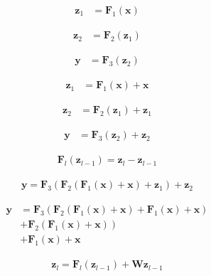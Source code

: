 \documentclass{article}
\begin{document}
\begin{align*}
\mathbf{z}_{1} & =\mathbf{F}_{1}(\mathbf{x})  \tag{9.32}
\end{align*}

\begin{align*}
\mathbf{z}_{2} & =\mathbf{F}_{2}\left(\mathbf{z}_{1}\right)  \tag{9.33}
\end{align*}

\begin{align*}
\mathbf{y} & =\mathbf{F}_{3}\left(\mathbf{z}_{2}\right) \tag{9.34}
\end{align*}

\begin{align*}
\mathbf{z}_{1} & =\mathbf{F}_{1}(\mathbf{x})+\mathbf{x}  \tag{9.35}
\end{align*}

\begin{align*}
\mathbf{z}_{2} & =\mathbf{F}_{2}\left(\mathbf{z}_{1}\right)+\mathbf{z}_{1}  \tag{9.36}
\end{align*}

\begin{align*}
\mathbf{y} & =\mathbf{F}_{3}\left(\mathbf{z}_{2}\right)+\mathbf{z}_{2} \tag{9.37}
\end{align*}

\begin{align*}
\mathbf{F}_{l}\left(\mathbf{z}_{l-1}\right)=\mathbf{z}_{l}-\mathbf{z}_{l-1} \tag{9.38}
\end{align*}

\begin{align*}
\mathbf{y}=\mathbf{F}_{3}\left(\mathbf{F}_{2}\left(\mathbf{F}_{1}(\mathbf{x})+\mathbf{x}\right)+\mathbf{z}_{1}\right)+\mathbf{z}_{2} \tag{9.39}
\end{align*}

\begin{align*}
\mathbf{y} & =\mathbf{F}_{3}\left(\mathbf{F}_{2}\left(\mathbf{F}_{1}(\mathbf{x})+\mathbf{x}\right)+\mathbf{F}_{1}(\mathbf{x})+\mathbf{x}\right) \\
& \left.+\mathbf{F}_{2}\left(\mathbf{F}_{1}(\mathbf{x})+\mathbf{x}\right)\right) \\
& +\mathbf{F}_{1}(\mathbf{x})+\mathbf{x}
\tag{9.40}
\end{align*}

\begin{align*}
\mathbf{z}_{l}=\mathbf{F}_{l}\left(\mathbf{z}_{l-1}\right)+\mathbf{W} \mathbf{z}_{l-1} \tag{9.41}
\end{align*}
\end{document}
